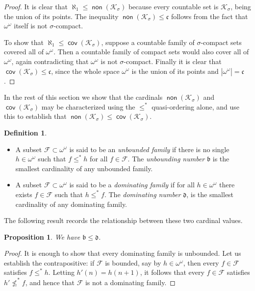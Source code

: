 \documentclass[11pt,oneside,a4paper]{amsbook}
\newcommand{\Ksigma}{\mathcal K_\sigma}
\DeclareMathOperator{\non}{\mathsf{non}}
\DeclareMathOperator{\cov}{\mathsf{cov}}
\theoremstyle{definition}
\theoremstyle{plain}
\newtheorem{proposition}[theorem]{Proposition}
\theoremstyle{definition}
\newtheorem{definition}[theorem]{Definition}
\theoremstyle{remark}
\numberwithin{equation}{section}
\numberwithin{figure}{section}
\begin{document}
\begin{proof}
  It is clear that $\aleph_1\leq\non(\Ksigma)$ because every countable set is $\Ksigma$, being the union of its points. The inequality $\non(\Ksigma)\leq\mathfrak c$ follows from the fact that $\omega^\omega$ itself is not $\sigma$-compact.

  To show that $\aleph_1\leq\cov(\Ksigma)$, suppose a countable family of $\sigma$-compact sets covered all of $\omega^\omega$. Then a countable family of compact sets would also cover all of $\omega^\omega$, again contradicting that $\omega^\omega$ is not $\sigma$-compact. Finally it is clear that $\cov(\Ksigma)\leq\mathfrak c$, since the whole space $\omega^\omega$ is the union of its points and $|\omega^\omega|=\mathfrak c$.
\end{proof}

In the rest of this section we show that the cardinals $\non(\Ksigma)$ and $\cov(\Ksigma)$ may be characterized using the $\leq^*$ quasi-ordering alone, and use this to establish that $\non(\Ksigma)\leq\cov(\Ksigma)$.

\begin{definition}
  \begin{itemize}
  \item A subset $\mathcal F\subset\omega^\omega$ is said to be an \emph{unbounded family} if there is no single $h\in\omega^\omega$ such that $f\leq^*h$ for all $f\in\mathcal F$. The \emph{unbounding number} $\mathfrak b$ is the smallest cardinality of any unbounded family.
  \item A subset $\mathcal F\subset\omega^\omega$ is said to be a \emph{dominating family} if for all $h\in\omega^\omega$ there exists $f\in\mathcal F$ such that $h\leq^*f$. The \emph{dominating number} $\mathfrak d$, is the smallest cardinality of any dominating family.
  \end{itemize}
\end{definition}

The following result records the relationship between these two cardinal values.

\begin{proposition}
  \label{prop:bd}
  We have $\mathfrak{b}\leq\mathfrak{d}$.
\end{proposition}

\begin{proof}
  It is enough to show that every dominating family is unbounded. Let us establish the contrapositive: if $\mathcal F$ is bounded, say by $h\in\omega^\omega$, then every $f\in\mathcal F$ satisfies $f\leq^*h$. Letting $h'(n)=h(n+1)$, it follows that every $f\in\mathcal F$ satisfies $h'\not\leq^*f$, and hence that $\mathcal F$ is not a dominating family.
\end{proof}
\end{document}
